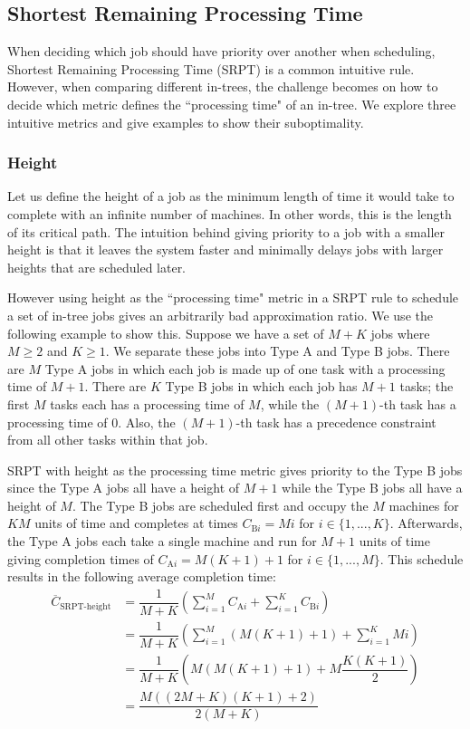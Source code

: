 \subsection{Shortest Remaining Processing Time}
When deciding which job should have priority over another when scheduling, Shortest Remaining Processing Time (SRPT) is a common intuitive rule.
However, when comparing different in-trees, the challenge becomes on how to decide which metric defines the ``processing time" of an in-tree.
We explore three intuitive metrics and give examples to show their suboptimality.

\subsubsection{Height}

Let us define the height of a job as the minimum length of time it would take to complete with an infinite number of machines.
In other words, this is the length of its critical path.
The intuition behind giving priority to a job with a smaller height is that it leaves the system faster and minimally delays jobs with larger heights that are scheduled later.

However using height as the ``processing time" metric in a SRPT rule to schedule a set of in-tree jobs gives an arbitrarily bad approximation ratio.
We use the following example to show this.
Suppose we have a set of $M+K$ jobs where $M\geq 2$ and $K\geq 1$.
We separate these jobs into Type A and Type B jobs.
There are $M$ Type A jobs in which each job is made up of one task with a processing time of $M+1$.
There are $K$ Type B jobs in which each job has $M+1$ tasks; the first $M$ tasks each has a processing time of $M$, while the $(M+1)$-th task has a processing time of 0.
Also, the $(M+1)$-th task has a precedence constraint from all other tasks within that job.

SRPT with height as the processing time metric gives priority to the Type B jobs since the Type A jobs all have a height of $M+1$ while the Type B jobs all have a height of $M$.
The Type B jobs are scheduled first and occupy the $M$ machines for $KM$ units of time and completes at times $C_{\text{B}i}=Mi$ for $i\in\{1,...,K\}$.
Afterwards, the Type A jobs each take a single machine and run for $M+1$ units of time giving completion times of $C_{\text{A}i}=M(K+1)+1$ for $i\in\{1,...,M\}$.
This schedule results in the following average completion time:
\begin{align}
	\overline{C}_\text{SRPT-height} & = \dfrac{1}{M+K}\left(\sum_{i=1}^M C_{\text{A}i} + \sum_{i=1}^K C_{\text{B}i}\right) \nonumber \\
	& = \dfrac{1}{M+K}\left(\sum_{i=1}^M (M(K+1)+1) + \sum_{i=1}^K Mi\right) \nonumber \\
	& = \dfrac{1}{M+K}\left(M(M(K+1)+1) + M\dfrac{K(K+1)}{2}\right) \nonumber \\
	& = \dfrac{M((2M+K)(K+1)+2)}{2(M+K)}
\end{align}

